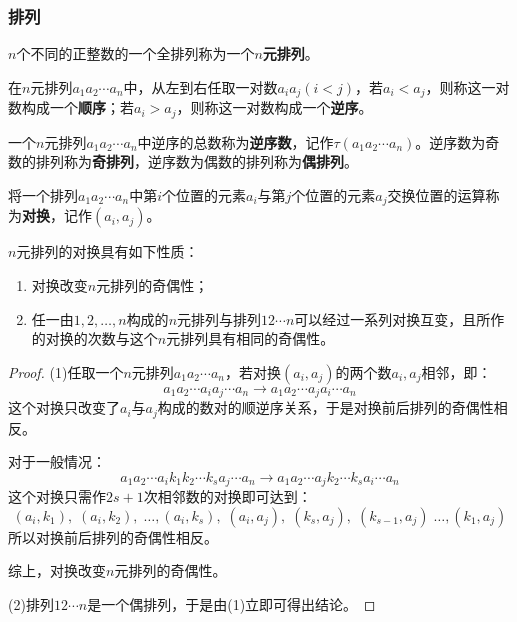 \subsubsection{排列}
\begin{definition}
	$n$个不同的正整数的一个全排列称为一个\textbf{$n$元排列}。
\end{definition}
\begin{definition}
	在$n$元排列$a_1a_2\cdots a_n$中，从左到右任取一对数$a_ia_j(i<j)$，若$a_i<a_j$，则称这一对数构成一个\textbf{顺序}；若$a_i>a_j$，则称这一对数构成一个\textbf{逆序}。
\end{definition}
\begin{definition}
	一个$n$元排列$a_1a_2\cdots a_n$中逆序的总数称为\textbf{逆序数}，记作$\tau(a_1a_2\cdots a_n)$。逆序数为奇数的排列称为\textbf{奇排列}，逆序数为偶数的排列称为\textbf{偶排列}。
\end{definition}
\begin{definition}
	将一个排列$a_1a_2\cdots a_n$中第$i$个位置的元素$a_i$与第$j$个位置的元素$a_j$交换位置的运算称为\textbf{对换}，记作$(a_i,a_j)$。
\end{definition}
\begin{property}\label{prop:Transposition}
	$n$元排列的对换具有如下性质：
	\begin{enumerate}
		\item 对换改变$n$元排列的奇偶性；
		\item 任一由$1,2,\dots,n$构成的$n$元排列与排列$12\cdots n$可以经过一系列对换互变，且所作的对换的次数与这个$n$元排列具有相同的奇偶性。
	\end{enumerate}
\end{property}
\begin{proof}
	(1)任取一个$n$元排列$a_1a_2\cdots a_n$，若对换$(a_i,a_j)$的两个数$a_i,a_j$相邻，即：
	\begin{equation*}
		a_1a_2\cdots a_ia_j\cdots a_n\longrightarrow a_1a_2\cdots a_ja_i\cdots a_n
	\end{equation*}
	这个对换只改变了$a_i$与$a_j$构成的数对的顺逆序关系，于是对换前后排列的奇偶性相反。\par
	对于一般情况：
	\begin{equation*}
		a_1a_2\cdots a_ik_1k_2\cdots k_sa_j\cdots a_n\longrightarrow a_1a_2\cdots a_jk_2\cdots k_sa_i\cdots a_n
	\end{equation*}
	这个对换只需作$2s+1$次相邻数的对换即可达到：
	\begin{equation*}
		(a_i,k_1),\;(a_i,k_2),\;\dots,(a_i,k_s),\;(a_i,a_j),\;(k_s,a_j),\;(k_{s-1},a_j)\;\dots,(k_1,a_j)	
	\end{equation*}
	所以对换前后排列的奇偶性相反。\par
	综上，对换改变$n$元排列的奇偶性。\par
	(2)排列$12\cdots n$是一个偶排列，于是由(1)立即可得出结论。
\end{proof}
